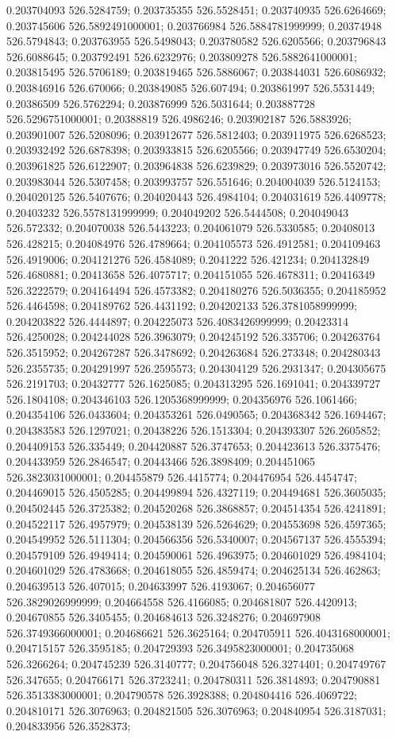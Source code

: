 0.203704093 526.5284759; 0.203735355 526.5528451; 0.203740935 526.6264669; 0.203745606 526.5892491000001; 0.203766984 526.5884781999999; 0.20374948 526.5794843; 0.203763955 526.5498043; 0.203780582 526.6205566; 0.203796843 526.6088645; 0.203792491 526.6232976; 0.203809278 526.5882641000001; 0.203815495 526.5706189; 0.203819465 526.5886067; 0.203844031 526.6086932; 0.203846916 526.670066; 0.203849085 526.607494; 0.203861997 526.5531449; 0.20386509 526.5762294; 0.203876999 526.5031644; 0.203887728 526.5296751000001; 0.20388819 526.4986246; 0.203902187 526.5883926; 0.203901007 526.5208096; 0.203912677 526.5812403; 0.203911975 526.6268523; 0.203932492 526.6878398; 0.203933815 526.6205566; 0.203947749 526.6530204; 0.203961825 526.6122907; 0.203964838 526.6239829; 0.203973016 526.5520742; 0.203983044 526.5307458; 0.203993757 526.551646; 0.204004039 526.5124153; 0.204020125 526.5407676; 0.204020443 526.4984104; 0.204031619 526.4409778; 0.20403232 526.5578131999999; 0.204049202 526.5444508; 0.204049043 526.572332; 0.204070038 526.5443223; 0.204061079 526.5330585; 0.20408013 526.428215; 0.204084976 526.4789664; 0.204105573 526.4912581; 0.204109463 526.4919006; 0.204121276 526.4584089; 0.2041222 526.421234; 0.204132849 526.4680881; 0.20413658 526.4075717; 0.204151055 526.4678311; 0.20416349 526.3222579; 0.204164494 526.4573382; 0.204180276 526.5036355; 0.204185952 526.4464598; 0.204189762 526.4431192; 0.204202133 526.3781058999999; 0.204203822 526.4444897; 0.204225073 526.4083426999999; 0.20423314 526.4250028; 0.204244028 526.3963079; 0.204245192 526.335706; 0.204263764 526.3515952; 0.204267287 526.3478692; 0.204263684 526.273348; 0.204280343 526.2355735; 0.204291997 526.2595573; 0.204304129 526.2931347; 0.204305675 526.2191703; 0.20432777 526.1625085; 0.204313295 526.1691041; 0.204339727 526.1804108; 0.204346103 526.1205368999999; 0.204356976 526.1061466; 0.204354106 526.0433604; 0.204353261 526.0490565; 0.204368342 526.1694467; 0.204383583 526.1297021; 0.20438226 526.1513304; 0.204393307 526.2605852; 0.204409153 526.335449; 0.204420887 526.3747653; 0.204423613 526.3375476; 0.204433959 526.2846547; 0.20443466 526.3898409; 0.204451065 526.3823031000001; 0.204455879 526.4415774; 0.204476954 526.4454747; 0.204469015 526.4505285; 0.204499894 526.4327119; 0.204494681 526.3605035; 0.204502445 526.3725382; 0.204520268 526.3868857; 0.204514354 526.4241891; 0.204522117 526.4957979; 0.204538139 526.5264629; 0.204553698 526.4597365; 0.204549952 526.5111304; 0.204566356 526.5340007; 0.204567137 526.4555394; 0.204579109 526.4949414; 0.204590061 526.4963975; 0.204601029 526.4984104; 0.204601029 526.4783668; 0.204618055 526.4859474; 0.204625134 526.462863; 0.204639513 526.407015; 0.204633997 526.4193067; 0.204656077 526.3829026999999; 0.204664558 526.4166085; 0.204681807 526.4420913; 0.204670855 526.3405455; 0.204684613 526.3248276; 0.204697908 526.3749366000001; 0.204686621 526.3625164; 0.204705911 526.4043168000001; 0.204715157 526.3595185; 0.204729393 526.3495823000001; 0.204735068 526.3266264; 0.204745239 526.3140777; 0.204756048 526.3274401; 0.204749767 526.347655; 0.204766171 526.3723241; 0.204780311 526.3814893; 0.204790881 526.3513383000001; 0.204790578 526.3928388; 0.204804416 526.4069722; 0.204810171 526.3076963; 0.204821505 526.3076963; 0.204840954 526.3187031; 0.204833956 526.3528373; 